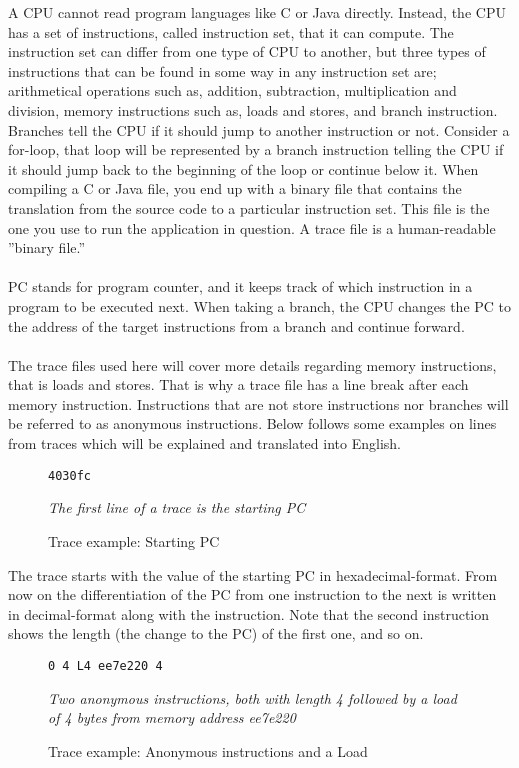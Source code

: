 A CPU cannot read program languages like C or Java directly. Instead, the CPU
has a set of instructions, called instruction set, that it can compute. The instruction
set can differ from one type of CPU to another, but three types of instructions that
can be found in some way in any instruction set are; arithmetical operations such
as, addition, subtraction, multiplication and division, memory instructions such as,
loads and stores, and branch instruction. Branches tell the CPU if it should jump to another
instruction or not. Consider a for-loop, that loop will be represented by a branch
instruction telling the CPU if it should jump back to the beginning of the loop or
continue below it. When compiling a C or Java file, you end up with a binary file
that contains the translation from the source code to a particular instruction set. This file
is the one you use to run the application in question. A trace file is a human-readable
”binary file.”
\\\\
PC stands for program counter, and it keeps track of which instruction in a program
to be executed next. When taking a branch, the CPU changes the PC to the address of the target instructions from a branch and continue forward.
\\\\
The trace files used here will cover more details regarding memory instructions,
that is loads and stores. That is why a trace file has a line break after each memory
instruction. Instructions that are not store instructions nor branches will be referred to as anonymous instructions. Below follows some examples on lines from traces which will be
explained and translated into English.
\begin{figure}[h]
\begin{lstlisting}[frame=single]  
4030fc
\end{lstlisting}
\centering
 \emph{The first line of a trace is the starting PC}
  \caption{Trace example: Starting PC}
\end{figure}

The trace starts with the value of the starting PC in hexadecimal-format. From now on the differentiation of the PC from one instruction to the next is written in decimal-format along with the instruction. Note that the second instruction shows the length
(the change to the PC) of the first one, and so on.

\begin{figure}[h]
\begin{lstlisting}[frame=single]  
0 4 L4 ee7e220 4
\end{lstlisting}
\centering
\emph{Two anonymous instructions, both with length 4 followed by a load of 4
bytes from memory address ee7e220}
  \caption{Trace example: Anonymous instructions and a Load}
\end{figure}

